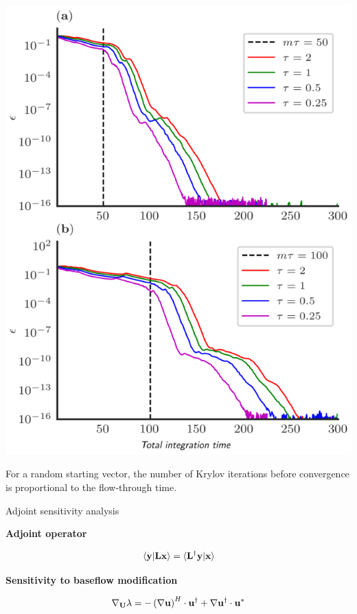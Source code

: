 \documentclass[aspectratio=169, usenames, dvipsnames]{beamer}
\begin{document}
{

  \begin{frame}
    \vfill
    \begin{minipage}{.48\textwidth}
      \includegraphics[width=\textwidth]{fig24}
    \end{minipage}%
    \hfill
    \begin{minipage}{.48\textwidth}
      For a random starting vector, the number of Krylov iterations before convergence is proportional to the flow-through time.
    \end{minipage}
    \vfill
  \end{frame}
}


\begin{frame}[t, c]{Adjoint sensitivity analysis}{}
  \vfill
  \begin{minipage}{.48\textwidth}
    \centering
    \textbf{Adjoint operator}
    
    \Large
    \[
      \langle \vb{y} \vert \vb{Lx} \rangle = \langle \vb{L}^{\dagger}\vb{y} \vert \vb{x} \rangle
    \]
  \end{minipage}%
  \hfill
  \begin{minipage}{.48\textwidth}
    \centering
    \textbf{Sensitivity to baseflow modification}
    
    \Large
    \[
      \nabla_{\vb{U}} \lambda = - \left( \nabla \vb{u} \right)^H \cdot \vb{u}^{\dagger} + \nabla \vb{u}^{\dagger} \cdot \vb{u}^*
    \]
  \end{minipage}
  \vfill
\end{frame}
\end{document}
